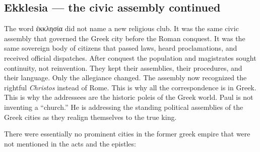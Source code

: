\subsection{Ekklesia — the civic assembly continued}\label{subsec:ekklesia-the-civic-assembly-continued}

The word ἐκκλησία did not name a new religious club.
It was the same civic assembly that governed the Greek city before the Roman conquest.
It was the same sovereign body of citizens that passed laws, heard proclamations, and received official dispatches.
After conquest the population and magistrates sought continuity, not reinvention.
They kept their assemblies, their procedures, and their language.
Only the allegiance changed.
The assembly now recognized the rightful \textit{Christos} instead of Rome.
This is why all the correspondence is in Greek.
This is why the addressees are the historic poleis of the Greek world.
Paul is not inventing a “church.”
He is addressing the standing political assemblies of the Greek cities as they realign themselves to the true king.

There were essentially no prominent cities in the former greek empire that were not mentioned in the acts and the epistles:

